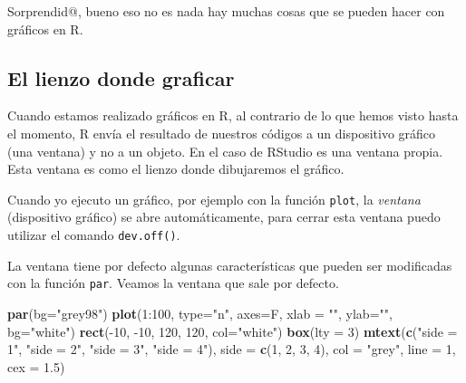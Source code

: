 \documentclass[]{article}
\newenvironment{Shaded}{\begin{snugshade}}{\end{snugshade}}
\newcommand{\KeywordTok}[1]{\textcolor[rgb]{0.13,0.29,0.53}{\textbf{{#1}}}}
\newcommand{\DataTypeTok}[1]{\textcolor[rgb]{0.13,0.29,0.53}{{#1}}}
\newcommand{\DecValTok}[1]{\textcolor[rgb]{0.00,0.00,0.81}{{#1}}}
\newcommand{\FloatTok}[1]{\textcolor[rgb]{0.00,0.00,0.81}{{#1}}}
\newcommand{\StringTok}[1]{\textcolor[rgb]{0.31,0.60,0.02}{{#1}}}
\newcommand{\NormalTok}[1]{{#1}}
\begin{document}
Sorprendid@, bueno eso no es nada hay muchas cosas que se pueden hacer
con gráficos en R.

\subsection{El lienzo donde graficar}\label{el-lienzo-donde-graficar}

Cuando estamos realizado gráficos en R, al contrario de lo que hemos
visto hasta el momento, R envía el resultado de nuestros códigos a un
dispositivo gráfico (una ventana) y no a un objeto. En el caso de
RStudio es una ventana propia. Esta ventana es como el lienzo donde
dibujaremos el gráfico.

Cuando yo ejecuto un gráfico, por ejemplo con la función \texttt{plot},
la \emph{ventana} (dispositivo gráfico) se abre automáticamente, para
cerrar esta ventana puedo utilizar el comando \texttt{dev.off()}.

La ventana tiene por defecto algunas características que pueden ser
modificadas con la función \texttt{par}. Veamos la ventana que sale por
defecto.

\begin{Shaded}
\begin{Highlighting}[]
\KeywordTok{par}\NormalTok{(}\DataTypeTok{bg=}\StringTok{"grey98"}\NormalTok{)}
\KeywordTok{plot}\NormalTok{(}\DecValTok{1}\NormalTok{:}\DecValTok{100}\NormalTok{, }\DataTypeTok{type=}\StringTok{"n"}\NormalTok{, }\DataTypeTok{axes=}\NormalTok{F, }\DataTypeTok{xlab =} \StringTok{""}\NormalTok{, }\DataTypeTok{ylab=}\StringTok{""}\NormalTok{, }\DataTypeTok{bg=}\StringTok{"white"}\NormalTok{)}
\KeywordTok{rect}\NormalTok{(-}\DecValTok{10}\NormalTok{, -}\DecValTok{10}\NormalTok{, }\DecValTok{120}\NormalTok{, }\DecValTok{120}\NormalTok{, }\DataTypeTok{col=}\StringTok{"white"}\NormalTok{)}
\KeywordTok{box}\NormalTok{(}\DataTypeTok{lty =} \DecValTok{3}\NormalTok{)}
\KeywordTok{mtext}\NormalTok{(}\KeywordTok{c}\NormalTok{(}\StringTok{"side = 1"}\NormalTok{, }\StringTok{"side = 2"}\NormalTok{, }\StringTok{"side = 3"}\NormalTok{, }\StringTok{"side = 4"}\NormalTok{),}
\DataTypeTok{side =} \KeywordTok{c}\NormalTok{(}\DecValTok{1}\NormalTok{, }\DecValTok{2}\NormalTok{, }\DecValTok{3}\NormalTok{, }\DecValTok{4}\NormalTok{), }\DataTypeTok{col =} \StringTok{"grey"}\NormalTok{, }\DataTypeTok{line =} \DecValTok{1}\NormalTok{, }\DataTypeTok{cex =} \FloatTok{1.5}\NormalTok{)}
\end{Highlighting}
\end{Shaded}
\end{document}
